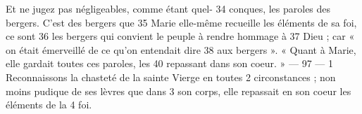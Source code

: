 Et ne jugez pas négligeables, comme étant quel-	 
34	 	conques, les paroles des bergers. C'est des bergers que	 
35	 	Marie elle-même recueille les éléments de sa foi, ce sont	 
36	 	les bergers qui convient le peuple à rendre hommage à	 
37	 	Dieu ; car « on était émerveillé de ce qu'on entendait dire	 
38	 	aux bergers ».
« Quant à Marie, elle gardait toutes ces paroles, les	 
40	 	repassant dans son coeur. »	 
 	--- 97 ---	 
1	 	Reconnaissons la chasteté de la sainte Vierge en toutes	 
2	 	circonstances ; non moins pudique de ses lèvres que dans	 
3	 	son corps, elle repassait en son coeur les éléments de la	 
4	 	foi.